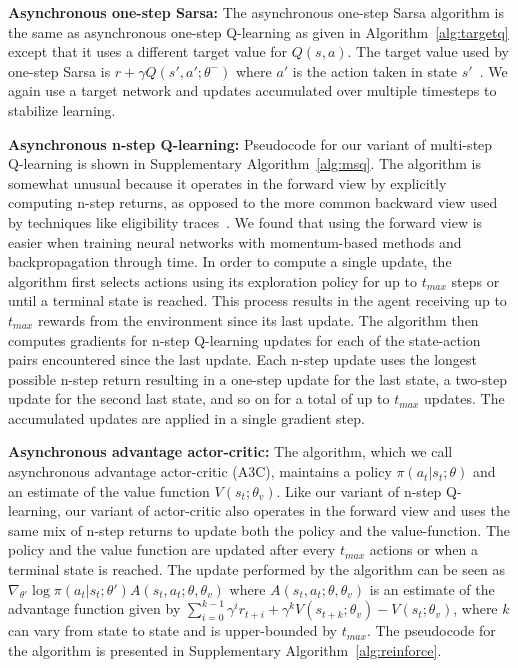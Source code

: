 \documentclass{article} %
\begin{document}
%
%
%
%

%

\textbf{Asynchronous one-step Sarsa:}
The asynchronous one-step Sarsa algorithm is the same as asynchronous one-step Q-learning as given in Algorithm~\ref{alg:targetq} except that it uses a different target value for $Q(s,a)$.
The target value used by one-step Sarsa is $r + \gamma Q(s', a'; \theta^-)$ where $a'$ is the action taken in state $s'$~\citep{rummery1994sarsa,sutton:book}.
%
%
%
%
%
%
%
%
%
We again use a target network and updates accumulated over multiple timesteps to stabilize learning.

%

%
%
%
%
%
%
%
%
%
%
%
%
%
%
%
%
%
%
%
%
%
%
%
%
%
%
%
%
%
%
%
%
%
%
%
%
%
%
%
%
%

\textbf{Asynchronous n-step Q-learning:}
Pseudocode for our variant of multi-step Q-learning is shown in Supplementary Algorithm~\ref{alg:msq}.
The algorithm is somewhat unusual because it operates in the forward view by explicitly computing n-step returns, as opposed to the more common backward view used by techniques like eligibility traces~\citep{sutton:book}.
We found that using the forward view is easier when training neural networks with momentum-based methods and backpropagation through time.
In order to compute a single update, the algorithm first selects actions using its exploration policy for up to $t_{max}$ steps or until a terminal state is reached.
This process results in the agent receiving up to $t_{max}$ rewards from the environment since its last update.
The algorithm then computes gradients for n-step Q-learning updates for each of the state-action pairs encountered since the last update.
Each n-step update uses the longest possible n-step return resulting in a one-step update for the last state, a two-step update for the second last state, and so on for a total of up to $t_{max}$ updates.
The accumulated updates are applied in a single gradient step.

%

%
%
%
%
%
%
%
%
%
%
%
%
%
%
%
%
%
%
%
%
%
%
%
%
%
%
%
%
%
%
%
%
%
%
%
%
%

\textbf{Asynchronous advantage actor-critic:}
The algorithm, which we call asynchronous advantage actor-critic (A3C), maintains a policy $\pi(a_t|s_t;\theta)$ and an estimate of the value function $V(s_t;\theta_v)$.
Like our variant of n-step Q-learning, our variant of actor-critic also operates in the forward view and uses the same mix of n-step returns to update both the policy and the value-function.
The policy and the value function are updated after every $t_{max}$ actions or when a terminal state is reached.
The update performed by the algorithm can be seen as $\nabla_{\theta'} \log\pi(a_t|s_t;\theta') A(s_t,a_t;\theta,\theta_v)$ where $A(s_t,a_t;\theta,\theta_v)$ is an estimate of the advantage function given by $\sum_{i=0}^{k-1}\gamma^i r_{t+i} + \gamma^k V(s_{t+k};\theta_v)-V(s_t;\theta_v)$, where $k$ can vary from state to state and is upper-bounded by $t_{max}$.
The pseudocode for the algorithm is presented in Supplementary Algorithm~\ref{alg:reinforce}.
\end{document}
